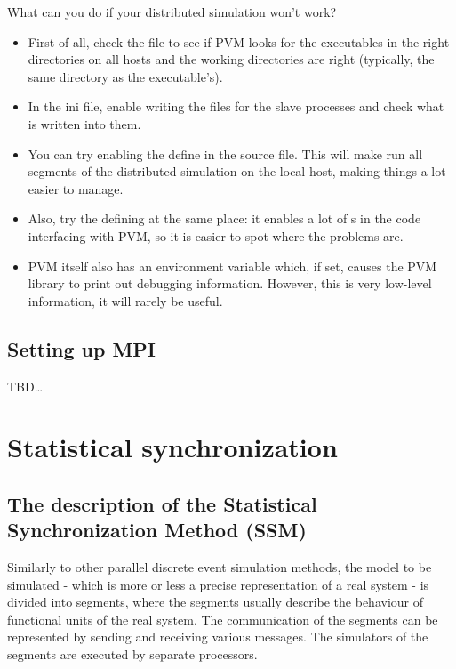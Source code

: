 What can you do if your distributed {\opp} simulation won't 
work?
\begin{itemize}
  \item{First of all, check the  file to see if PVM
    looks for the executables in the right directories on all hosts
    and the working directories are right (typically, the same
    directory as the executable's).}
  \item{In the ini file, enable writing the  files for
    the slave processes and check what is written into them.}
  \item{You can try enabling the  define in the
     source file. This will make {\opp} run all
    segments of the distributed simulation on the local host, making
    things a lot easier to manage. }
  \item{Also, try the defining  at the same place: it
    enables a lot of s in the code interfacing with
    PVM, so it is easier to spot where the problems are.}
  \item{PVM itself also has an environment variable which, if set,
    causes the PVM library to print out debugging information.
    However, this is very low-level information, it will rarely be
    useful.}
\end{itemize}




\subsection{Setting up MPI}

TBD\dots \\





\section{Statistical synchronization}
\begin{sloppypar}
\subsection{The description of the Statistical Synchronization Method (SSM)}
\end{sloppypar}

Similarly to other parallel discrete event simulation methods, the
model to be simulated - which is more or less a precise representation
of a real system - is divided into segments, where the segments
usually describe the behaviour of functional units of the real system.
The communication of the segments can be represented by sending and
receiving various messages. The simulators of the segments are
executed by separate processors.


